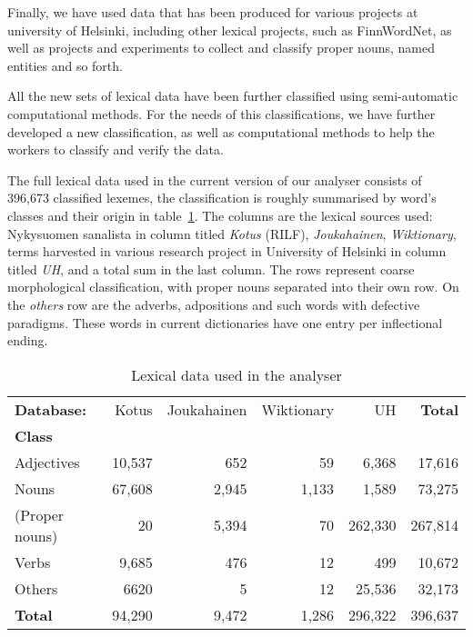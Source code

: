 \documentclass[a4paper,12pt]{article}
\begin{document}
Finally, we have used data that has been produced for various projects at
university of Helsinki, including other lexical projects, such as FinnWordNet,
as well as projects and experiments to collect and classify proper nouns, named
entities and so forth. 

All the new sets of lexical data have been further classified using
semi-automatic computational methods. For the needs of this classifications, we
have further developed a new classification, as well as computational methods
to help the workers to classify and verify the data.

The full lexical data used in the current version of our analyser consists of
396,673 classified lexemes, the classification is roughly summarised by word's
classes and their origin in table~\ref{table:lexical}. The columns are the
lexical sources used: Nykysuomen sanalista in column titled \emph{Kotus}
(RILF), \emph{Joukahainen}, \emph{Wiktionary}, terms harvested in various
research project in University of Helsinki in column titled \emph{UH}, and a
total sum in the last column. The rows represent coarse morphological
classification, with proper nouns separated into their own row. On the
\emph{others} row are the adverbs, adpositions and such words with defective
paradigms. These words in current dictionaries have one entry per inflectional
ending.

\begin{table}
  \centering
    \begin{tabular}{|l|r|r|r|r||r|}
        \hline
        \bf Database: & Kotus & Joukahainen & Wiktionary & UH & \bf Total \\
        \bf Class   & & & & & \\
        \hline
        Adjectives     & 10,537 & 652 & 59 & 6,368 & 17,616 \\
        Nouns          & 67,608 & 2,945 & 1,133 & 1,589 & 73,275\\
        (Proper nouns) & 20 & 5,394 & 70 & 262,330 & 267,814\\
        Verbs          & 9,685 & 476 & 12 & 499 & 10,672\\
        Others         & 6620 & 5 & 12 & 25,536 & 32,173 \\
        \hline
        \bf Total      & 94,290 & 9,472 & 1,286 & 296,322 & 396,637 \\
        \hline
    \end{tabular}
  \caption{Lexical data used in the analyser
  \label{table:lexical}}
\end{table}
\end{document}
